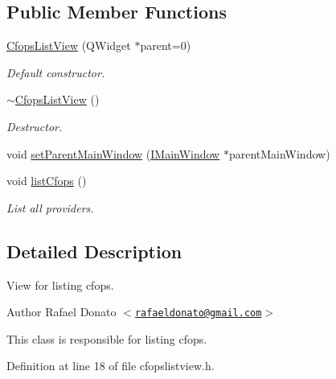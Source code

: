 \subsection*{\-Public \-Member \-Functions}
\begin{DoxyCompactItemize}
\item 
\hyperlink{class_cfops_list_view_a112d314c746cb60416e78805f023819d}{\-Cfops\-List\-View} (\-Q\-Widget $\ast$parent=0)
\begin{DoxyCompactList}\small\item\em \-Default constructor. \end{DoxyCompactList}\item 
\hyperlink{class_cfops_list_view_ac82e4cff1b47c820f925f9ba14fb5d93}{$\sim$\-Cfops\-List\-View} ()
\begin{DoxyCompactList}\small\item\em \-Destructor. \end{DoxyCompactList}\item 
void \hyperlink{class_cfops_list_view_a3de2327264d3ead784619fb4e9fe4e89}{set\-Parent\-Main\-Window} (\hyperlink{class_i_main_window}{\-I\-Main\-Window} $\ast$parent\-Main\-Window)
\item 
void \hyperlink{class_cfops_list_view_a39264050dee872f8e48f3d12597acccb}{list\-Cfops} ()
\begin{DoxyCompactList}\small\item\em \-List all providers. \end{DoxyCompactList}\end{DoxyCompactItemize}


\subsection{\-Detailed \-Description}
\-View for listing cfops. 

\begin{DoxyAuthor}{\-Author}
\-Rafael \-Donato $<$\href{mailto:rafaeldonato@gmail.com}{\tt rafaeldonato@gmail.\-com}$>$
\end{DoxyAuthor}
\-This class is responsible for listing cfops. 

\-Definition at line 18 of file cfopslistview.\-h.




